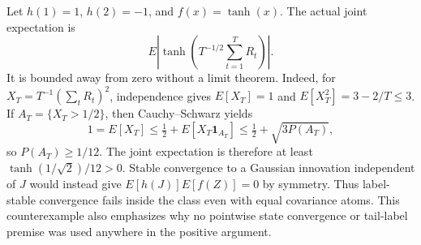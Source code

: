 Let \(h(1)=1\), \(h(2)=-1\), and \(f(x)=\tanh(x)\). The actual joint expectation is
\[
 E\left|\tanh\left(T^{-1/2}\sum_{t=1}^TR_t\right)\right|.
\]
It is bounded away from zero without a limit theorem. Indeed, for \(X_T=T^{-1}(\sum_tR_t)^2\), independence gives \(E[X_T]=1\) and \(E[X_T^2]=3-2/T\le3\). If \(A_T=\{X_T>1/2\}\), then Cauchy--Schwarz yields
\[
 1=E[X_T]\le\tfrac12+E[X_T\mathbf1_{A_T}]
 \le\tfrac12+\sqrt{3P(A_T)},
\]
so \(P(A_T)\ge1/12\). The joint expectation is therefore at least \(\tanh(1/\sqrt2)/12>0\). Stable convergence to a Gaussian innovation independent of \(J\) would instead give \(E[h(J)]E[f(Z)]=0\) by symmetry. Thus label-stable convergence fails inside the class even with equal covariance atoms. This counterexample also emphasizes why no pointwise state convergence or tail-label premise was used anywhere in the positive argument.